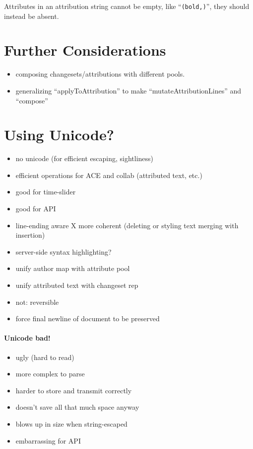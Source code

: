 \documentclass[12pt]{article}
\begin{document}
Attributes in an attribution string cannot be empty, like
``\verb|(bold,)|'', they should instead be absent.


\section{Further Considerations}

\begin{itemize}
\item composing changesets/attributions with different
  pools.
\item generalizing ``applyToAttribution'' to make
  ``mutateAttributionLines'' and ``compose''
\end{itemize}

\section{Using Unicode?}

\begin{itemize}
\item no unicode (for efficient escaping, sightliness)
\item efficient operations for ACE and collab (attributed text, etc.)
\item good for time-slider
\item good for API
\item line-ending aware
X more coherent (deleting or styling text merging with insertion)
\item server-side syntax highlighting?
\item unify author map with attribute pool
\item unify attributed text with changeset rep
\item not: reversible
\item force final newline of document to be preserved
\end{itemize}

\paragraph{Unicode bad!}

\begin{itemize}
\item ugly (hard to read)
\item more complex to parse
\item harder to store and transmit correctly
\item doesn't save all that much space anyway
\item blows up in size when string-escaped
\item embarrassing for API
\end{itemize}
\end{document}
